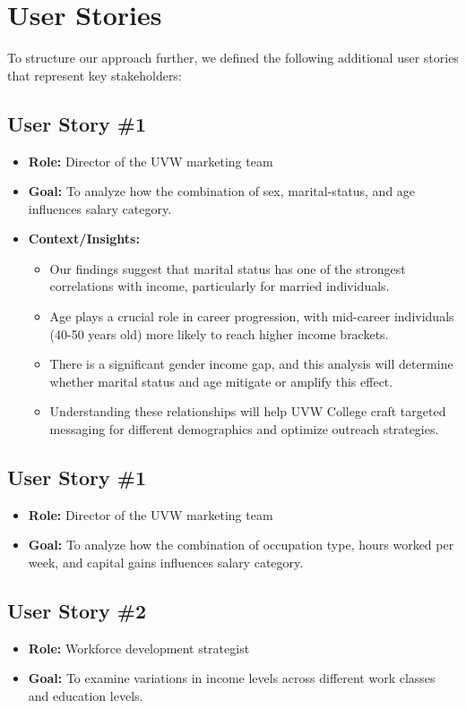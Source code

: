 \documentclass[journal]{IEEEtran}
\begin{document}
\section{User Stories}
To structure our approach further, we defined the following additional user stories that represent key stakeholders:

\subsection{User Story \#1}
\begin{itemize}
    \item \textbf{Role:} Director of the UVW marketing team
    \item \textbf{Goal:} To analyze how the combination of sex, marital-status, and age influences salary category.
    \item \textbf{Context/Insights:}
    \begin{itemize}
        \item Our findings suggest that marital status has one of the strongest correlations with income, particularly for married individuals.
        \item Age plays a crucial role in career progression, with mid-career individuals (40-50 years old) more likely to reach higher income brackets.
        \item There is a significant gender income gap, and this analysis will determine whether marital status and age mitigate or amplify this effect.
        \item Understanding these relationships will help UVW College craft targeted messaging for different demographics and optimize outreach strategies.
    \end{itemize}

\end{itemize}

\subsection{User Story \#1}
\begin{itemize}
    \item \textbf{Role:} Director of the UVW marketing team
    \item \textbf{Goal:} To analyze how the combination of occupation type, hours worked per week, and capital gains influences salary category.
\end{itemize}

\subsection{User Story \#2}
\begin{itemize}
    \item \textbf{Role:} Workforce development strategist
    \item \textbf{Goal:} To examine variations in income levels across different work classes and education levels.
\end{itemize}
\end{document}
